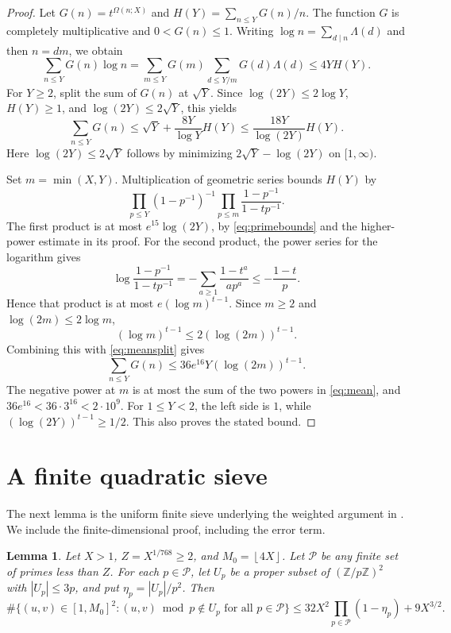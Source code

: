 \documentclass[11pt]{amsart}
\newtheorem{lemma}[theorem]{Lemma}
\theoremstyle{definition}
\theoremstyle{remark}
\numberwithin{equation}{section}
\newcommand{\Z}{\mathbb Z}
\newcommand{\Om}{\Omega}
\newcommand{\floor}[1]{\left\lfloor #1\right\rfloor}
\begin{document}
\begin{proof}
Let $G(n)=t^{\Om(n;X)}$ and $H(Y)=\sum_{n\le Y}G(n)/n$.
The function $G$ is completely multiplicative and $0<G(n)\le1$.
Writing $\log n=\sum_{d\mid n}\Lambda(d)$ and then $n=dm$, we obtain
\[
\sum_{n\le Y}G(n)\log n
=\sum_{m\le Y}G(m)\sum_{d\le Y/m}G(d)\Lambda(d)
\le4YH(Y).
\]
For $Y\ge2$, split the sum of $G(n)$ at $\sqrt Y$.
Since $\log(2Y)\le2\log Y$, $H(Y)\ge1$, and $\log(2Y)\le2\sqrt Y$, this yields
\begin{equation}\label{eq:meansplit}
\sum_{n\le Y}G(n)
\le\sqrt Y+\frac{8Y}{\log Y}H(Y)
\le\frac{18Y}{\log(2Y)}H(Y).
\end{equation}
Here $\log(2Y)\le2\sqrt Y$ follows by minimizing $2\sqrt Y-\log(2Y)$ on $[1,\infty)$.

Set $m=\min(X,Y)$.
Multiplication of geometric series bounds $H(Y)$ by
\[
\prod_{p\le Y}(1-p^{-1})^{-1}
\prod_{p\le m}\frac{1-p^{-1}}{1-tp^{-1}}.
\]
The first product is at most $e^{15}\log(2Y)$, by \eqref{eq:primebounds} and the higher-power estimate in its proof.
For the second product, the power series for the logarithm gives
\[
\log\frac{1-p^{-1}}{1-tp^{-1}}
=-\sum_{a\ge1}\frac{1-t^a}{ap^a}\le-\frac{1-t}{p}.
\]
Hence that product is at most $e(\log m)^{t-1}$.
Since $m\ge2$ and $\log(2m)\le2\log m$,
\[
(\log m)^{t-1}\le2(\log(2m))^{t-1}.
\]
Combining this with \eqref{eq:meansplit} gives
\[
\sum_{n\le Y}G(n)
\le36e^{16}Y(\log(2m))^{t-1}.
\]
The negative power at $m$ is at most the sum of the two powers in \eqref{eq:mean}, and
$36e^{16}<36\cdot3^{16}<2\cdot10^9$.
For $1\le Y<2$, the left side is $1$, while $(\log(2Y))^{t-1}\ge1/2$.
This also proves the stated bound.
\end{proof}

\section{A finite quadratic sieve}\label{sec:sieve}

The next lemma is the uniform finite sieve underlying the weighted argument in \cite[Appendix B]{CGM}.
We include the finite-dimensional proof, including the error term.

\begin{lemma}\label{lem:sieve}
Let $X>1$, $Z=X^{1/768}\ge2$, and $M_0=\floor{4X}$.
Let $\mathcal P$ be any finite set of primes less than $Z$.
For each $p\in\mathcal P$, let $U_p$ be a proper subset of $(\Z/p\Z)^2$ with $|U_p|\le3p$, and put $\eta_p=|U_p|/p^2$.
Then
\begin{equation}\label{eq:sieve}
\#\{(u,v)\in[1,M_0]^2:(u,v)\bmod p\notin U_p\text{ for all }p\in\mathcal P\}
\le32X^2\prod_{p\in\mathcal P}(1-\eta_p)+9X^{3/2}.
\end{equation}
\end{lemma}
\end{document}
